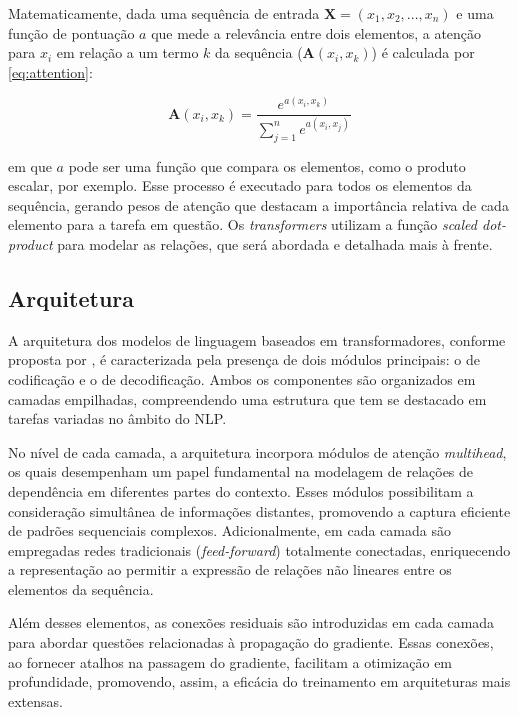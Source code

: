 Matematicamente, dada uma sequência de entrada $\boldsymbol{X} = (x_1, x_2, ..., x_n)$ e uma função de pontuação $a$ que mede a relevância entre dois elementos, a atenção para $x_i$ em relação a um termo $k$ da sequência ($\boldsymbol{A}(x_{i}, x_{k})$) é calculada por \ref{eq:attention}:

\begin{equation}
    \label{eq:attention}
    \boldsymbol{A}(x_{i}, x_{k}) = \frac{e^{a(x_{i}, x_{k})}}{\sum_{j=1}^{n} e^{a(x_{i}, x_{j})}}
\end{equation}

em que $a$ pode ser uma função que compara os elementos, como o produto escalar, por exemplo. Esse processo é executado para todos os elementos da sequência, gerando pesos de atenção que destacam a importância relativa de cada elemento para a tarefa em questão. Os \textit{transformers} utilizam a função \textit{scaled dot-product} para modelar as relações, que será abordada e detalhada mais à frente.

\subsection{Arquitetura}

A arquitetura dos modelos de linguagem baseados em transformadores, conforme proposta por \citet{attention2017}, é caracterizada pela presença de dois módulos principais: o de codificação e o de decodificação. Ambos os componentes são organizados em camadas empilhadas, compreendendo uma estrutura que tem se destacado em tarefas variadas no âmbito do NLP.

No nível de cada camada, a arquitetura incorpora módulos de atenção \textit{multihead}, os quais desempenham um papel fundamental na modelagem de relações de dependência em diferentes partes do contexto. Esses módulos possibilitam a consideração simultânea de informações distantes, promovendo a captura eficiente de padrões sequenciais complexos. Adicionalmente, em cada camada são empregadas redes tradicionais (\textit{feed-forward}) totalmente conectadas, enriquecendo a representação ao permitir a expressão de relações não lineares entre os elementos da sequência.

Além desses elementos, as conexões residuais são introduzidas em cada camada para abordar questões relacionadas à propagação do gradiente. Essas conexões, ao fornecer atalhos na passagem do gradiente, facilitam a otimização em profundidade, promovendo, assim, a eficácia do treinamento em arquiteturas mais extensas.

